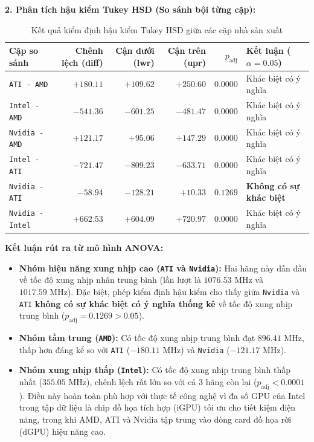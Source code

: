         \textbf{2. Phân tích hậu kiểm Tukey HSD (So sánh bội từng cặp):}
        \begin{table}[H]
            \centering
            \renewcommand{\arraystretch}{1.3}
            \begin{tabular}{|l|r|r|r|r|l|}
                \hline
                \textbf{Cặp so sánh} & \textbf{Chênh lệch (diff)} & \textbf{Cận dưới (lwr)} & \textbf{Cận trên (upr)} & \textbf{$p_{\text{adj}}$} & \textbf{Kết luận ($\alpha = 0.05$)} \\
                \hline
                \texttt{ATI - AMD} & $+180.11$ & $+109.62$ & $+250.60$ & $0.0000$ & Khác biệt có ý nghĩa \\
                \hline
                \texttt{Intel - AMD} & $-541.36$ & $-601.25$ & $-481.47$ & $0.0000$ & Khác biệt có ý nghĩa \\
                \hline
                \texttt{Nvidia - AMD} & $+121.17$ & $+95.06$ & $+147.29$ & $0.0000$ & Khác biệt có ý nghĩa \\
                \hline
                \texttt{Intel - ATI} & $-721.47$ & $-809.23$ & $-633.71$ & $0.0000$ & Khác biệt có ý nghĩa \\
                \hline
                \texttt{Nvidia - ATI} & $-58.94$ & $-128.21$ & $+10.33$ & $0.1269$ & \textbf{Không có sự khác biệt} \\
                \hline
                \texttt{Nvidia - Intel} & $+662.53$ & $+604.09$ & $+720.97$ & $0.0000$ & Khác biệt có ý nghĩa \\
                \hline
            \end{tabular}
            \caption{Kết quả kiểm định hậu kiểm Tukey HSD giữa các cặp nhà sản xuất}
            \label{tab:tukey_hsd}
        \end{table}

        \textbf{Kết luận rút ra từ mô hình ANOVA:}
        \begin{itemize}
            \item \textbf{Nhóm hiệu năng xung nhịp cao (\texttt{ATI} và \texttt{Nvidia}):} Hai hãng này dẫn đầu về tốc độ xung nhịp nhân trung bình (lần lượt là $1076.53\text{ MHz}$ và $1017.59\text{ MHz}$). Đặc biệt, phép kiểm định hậu kiểm cho thấy giữa \texttt{Nvidia} và \texttt{ATI} \textbf{không có sự khác biệt có ý nghĩa thống kê} về tốc độ xung nhịp trung bình ($p_{\text{adj}} = 0.1269 > 0.05$).
            \item \textbf{Nhóm tầm trung (\texttt{AMD}):} Có tốc độ xung nhịp trung bình đạt $896.41\text{ MHz}$, thấp hơn đáng kể so với \texttt{ATI} ($-180.11\text{ MHz}$) và \texttt{Nvidia} ($-121.17\text{ MHz}$).
            \item \textbf{Nhóm xung nhịp thấp (\texttt{Intel}):} Có tốc độ xung nhịp trung bình thấp nhất ($355.05\text{ MHz}$), chênh lệch rất lớn so với cả 3 hãng còn lại ($p_{\text{adj}} < 0.0001$). Điều này hoàn toàn phù hợp với thực tế công nghệ vì đa số GPU của Intel trong tập dữ liệu là chip đồ họa tích hợp (iGPU) tối ưu cho tiết kiệm điện năng, trong khi AMD, ATI và Nvidia tập trung vào dòng card đồ họa rời (dGPU) hiệu năng cao.
        \end{itemize}


